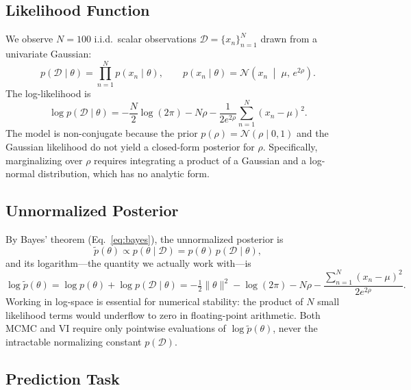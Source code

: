 \documentclass[12pt,a4paper]{article}
\newcommand{\D}{\mathcal{D}}
\newcommand{\N}{\mathcal{N}}
\newcommand{\pt}{\tilde{p}}
\begin{document}
\subsection{Likelihood Function}

We observe $N = 100$ i.i.d.\ scalar observations
$\D = \{x_n\}_{n=1}^{N}$ drawn from a univariate Gaussian:
\begin{equation}
  p(\D \mid \theta) = \prod_{n=1}^{N} p(x_n \mid \theta),
  \qquad
  p(x_n \mid \theta) = \N\!\left(x_n \;\middle|\; \mu,\, e^{2\rho}\right).
  \label{eq:likelihood}
\end{equation}
The log-likelihood is
\begin{equation}
  \log p(\D \mid \theta)
  = -\frac{N}{2}\log(2\pi) - N\rho
  - \frac{1}{2e^{2\rho}}\sum_{n=1}^{N}(x_n - \mu)^2.
  \label{eq:log_likelihood}
\end{equation}
The model is non-conjugate because the prior $p(\rho) = \N(\rho\mid 0,1)$
and the Gaussian likelihood do not yield a closed-form posterior for $\rho$.
Specifically, marginalizing over $\rho$ requires integrating a product of
a Gaussian and a log-normal distribution, which has no analytic form.

\subsection{Unnormalized Posterior}
\label{sec:unnorm}

By Bayes' theorem (Eq.~\eqref{eq:bayes}), the unnormalized posterior is
\begin{equation}
  \pt(\theta) \propto p(\theta \mid \D) = p(\theta)\,p(\D \mid \theta),
  \label{eq:unnorm}
\end{equation}
and its logarithm---the quantity we actually work with---is
\begin{equation}
  \log \pt(\theta)
  = \log p(\theta) + \log p(\D \mid \theta)
  = -\tfrac{1}{2}\|\theta\|^2 - \log(2\pi)
    - N\rho
    - \frac{\sum_{n=1}^N (x_n - \mu)^2}{2e^{2\rho}}.
  \label{eq:log_unnorm}
\end{equation}
Working in log-space is essential for numerical stability: the product
of $N$ small likelihood terms would underflow to zero in floating-point
arithmetic.
Both MCMC and VI require only pointwise evaluations of $\log \pt(\theta)$,
never the intractable normalizing constant $p(\D)$.

\subsection{Prediction Task}
\end{document}
